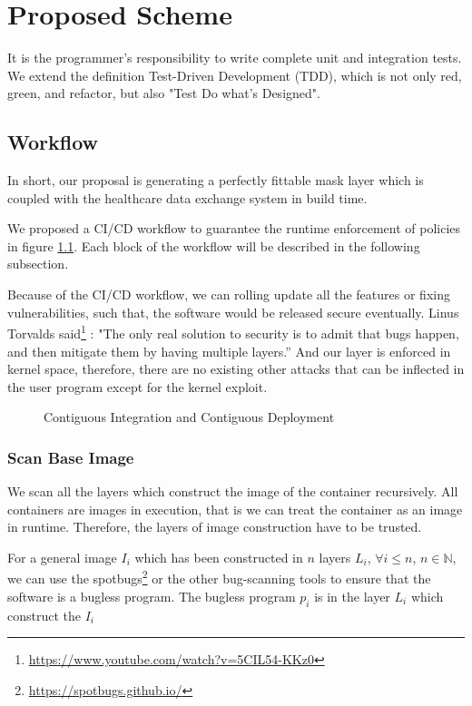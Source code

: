 \chapter{Proposed Scheme}
It is the programmer's responsibility to write complete unit and integration tests.
We extend the definition Test-Driven Development (TDD), which is not only red,
green, and refactor, but also "Test Do what's Designed".

\section{Workflow}
In short, our proposal is generating a perfectly fittable mask layer which
is coupled with the healthcare data exchange system in build time.

We proposed a CI/CD workflow to guarantee the runtime enforcement of policies
in figure \ref{fig:workflow}. Each block of the workflow will be described
in the following subsection.

Because of the CI/CD workflow, we can rolling update all the features or
fixing vulnerabilities, such that, the software would be released secure
eventually. Linus Torvalds said\footnote{\url{https://www.youtube.com/watch?v=5CIL54-KKz0}}
: "The only real solution to security is to admit that bugs happen, and
then mitigate them by having multiple layers.” And our layer is enforced
in kernel space, therefore, there are no existing other attacks that can
be inflected in the user program except for the kernel exploit.

\begin{figure}
    \centering
    \label{fig:workflow}
    \caption{Contiguous Integration and Contiguous Deployment}
\end{figure}

\subsection{Scan Base Image}
We scan all the layers which construct the image of the container recursively.
All containers are images in execution, that is we can treat the container
as an image in runtime. Therefore, the layers of image construction have to
be trusted.

For a general image $I_i$ which has been constructed in $n$ layers $L_i$,
$\forall i \le n$, $n \in \mathbb{N}$, we can use the spotbugs\footnote{\url{https://spotbugs.github.io/}}
or the other bug-scanning tools to ensure that the software is a bugless program.
The bugless program $p_i$ is in the layer $L_i$ which construct the $I_i$

